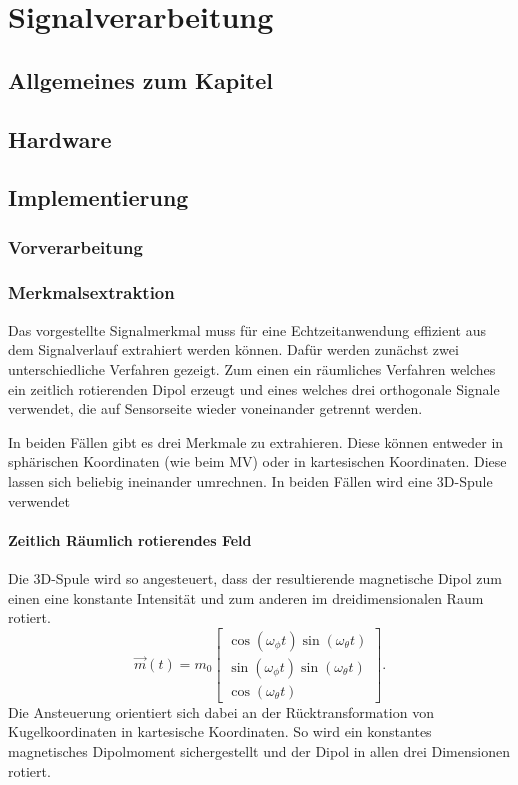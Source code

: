 \chapter{Signalverarbeitung}
\label{chap:signalverarbeitung}

  \section{Allgemeines zum Kapitel}
  \label{sec:allgemeines}  
  \section{Hardware}
	\section{Implementierung}
  \subsection{Vorverarbeitung}
  \subsection{Merkmalsextraktion}
Das vorgestellte Signalmerkmal muss für eine Echtzeitanwendung effizient aus dem Signalverlauf extrahiert werden können. Dafür werden zunächst zwei unterschiedliche Verfahren gezeigt. Zum einen ein räumliches Verfahren welches ein zeitlich rotierenden Dipol erzeugt und eines welches drei orthogonale Signale verwendet, die auf Sensorseite wieder voneinander getrennt werden. 

In beiden Fällen gibt es drei Merkmale zu extrahieren. Diese können entweder in sphärischen Koordinaten (wie beim MV) oder in kartesischen Koordinaten. Diese lassen sich beliebig ineinander umrechnen. In beiden Fällen wird eine 3D-Spule verwendet
	\subsubsection{Zeitlich Räumlich rotierendes Feld}
  Die 3D-Spule wird so angesteuert, dass der resultierende magnetische Dipol zum einen eine konstante Intensität und zum anderen im dreidimensionalen Raum rotiert. 
  \begin{equation}
    \vec{m}(t) = m_0 \left[\begin{array}{c} \cos(\omega_\phi t) \sin(\omega_\theta t)\\ \sin(\omega_\phi t)\sin(\omega_\theta t)\\ \cos(\omega_\theta t) \end{array}\right].
    \label{eq:rotDipole}
  \end{equation}
        Die Ansteuerung orientiert sich dabei an der Rücktransformation von Kugelkoordinaten in kartesische Koordinaten. So wird ein konstantes magnetisches Dipolmoment sichergestellt und der Dipol in allen drei Dimensionen rotiert. 

